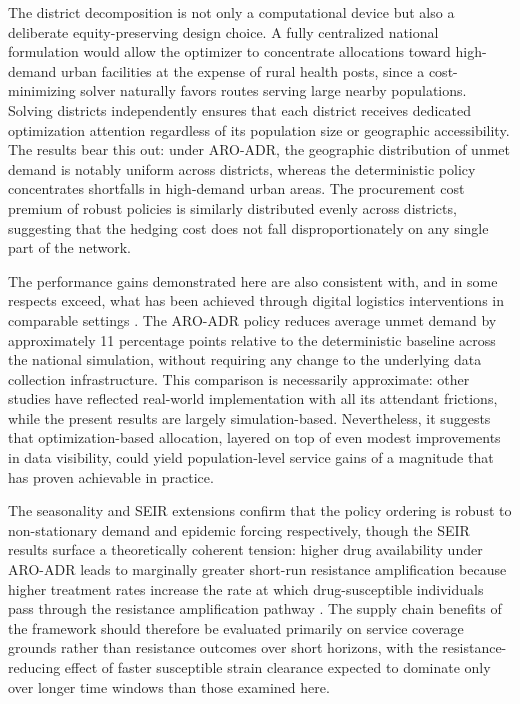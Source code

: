 \documentclass{article}
\begin{document}
The district decomposition is not only a computational device but also a deliberate equity-preserving design choice. A fully centralized national formulation would allow the optimizer to concentrate allocations toward high-demand urban facilities at the expense of rural health posts, since a cost-minimizing solver naturally favors routes serving large nearby populations. Solving districts independently ensures that each district receives dedicated optimization attention regardless of its population size or geographic accessibility. The results bear this out: under ARO-ADR, the geographic distribution of unmet demand is notably uniform across districts, whereas the deterministic policy concentrates shortfalls in high-demand urban areas. The procurement cost premium of robust policies is similarly distributed evenly across districts, suggesting that the hedging cost does not fall disproportionately on any single part of the network.

The performance gains demonstrated here are also consistent with, and in some respects exceed, what has been achieved through digital logistics interventions in comparable settings \cite{mwencha2016}. The ARO-ADR policy reduces average unmet demand by approximately 11 percentage points relative to the deterministic baseline across the national simulation, without requiring any change to the underlying data collection infrastructure. This comparison is necessarily approximate: other studies have reflected real-world implementation with all its attendant frictions, while the present results are largely simulation-based. Nevertheless, it suggests that optimization-based allocation, layered on top of even modest improvements in data visibility, could yield population-level service gains of a magnitude that has proven achievable in practice.

The seasonality and SEIR extensions confirm that the policy ordering is robust to non-stationary demand and epidemic forcing respectively, though the SEIR results surface a theoretically coherent tension: higher drug availability under ARO-ADR leads to marginally greater short-run resistance amplification because higher treatment rates increase the rate at which drug-susceptible individuals pass through the resistance amplification pathway \cite{kd20}. The supply chain benefits of the framework should therefore be evaluated primarily on service coverage grounds rather than resistance outcomes over short horizons, with the resistance-reducing effect of faster susceptible strain clearance expected to dominate only over longer time windows than those examined here.
\end{document}
